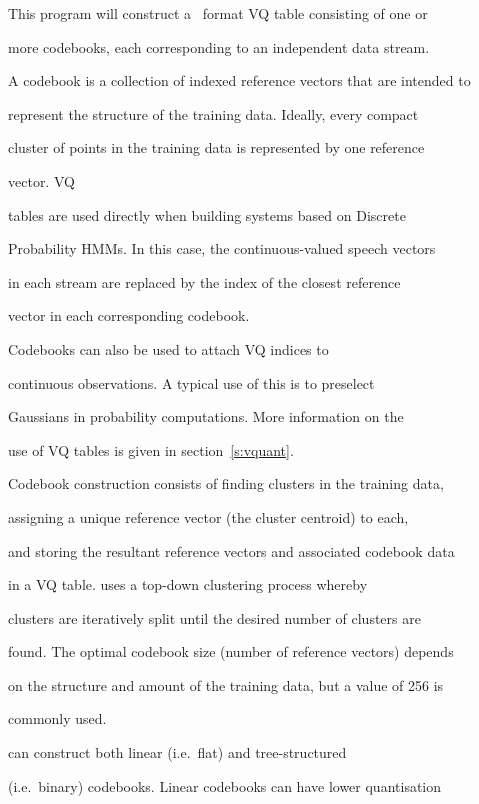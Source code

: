 This program will construct a \HTK\ format VQ table consisting of one or


more codebooks, each corresponding to an independent data stream.  


A codebook is a collection of indexed reference vectors that are intended to


represent the structure of the training data. Ideally, every compact


cluster of points in the training data is represented by one reference


vector.  VQ


tables are used directly when building systems based on Discrete


Probability HMMs.  In this case, the continuous-valued speech vectors


in each stream are replaced by the index of the closest reference


vector in each corresponding codebook.


Codebooks can also be used to attach VQ indices to


continuous observations.  A typical use of this is to preselect


Gaussians in probability computations.  More information on the


use of VQ tables is given in section~\ref{s:vquant}.





Codebook construction consists of finding clusters in the training data,


assigning a unique reference vector (the cluster centroid) to each,


and storing the resultant reference vectors and associated codebook data


in a VQ table.  uses a top-down clustering process whereby


clusters are iteratively split until the desired number of clusters are


found. The optimal codebook size (number of reference vectors) depends


on the structure and amount of the training data, but a value of 256 is


commonly used.





 can construct both linear (i.e.\ flat) and tree-structured


(i.e.\ binary) codebooks.  Linear codebooks can have lower quantisation


